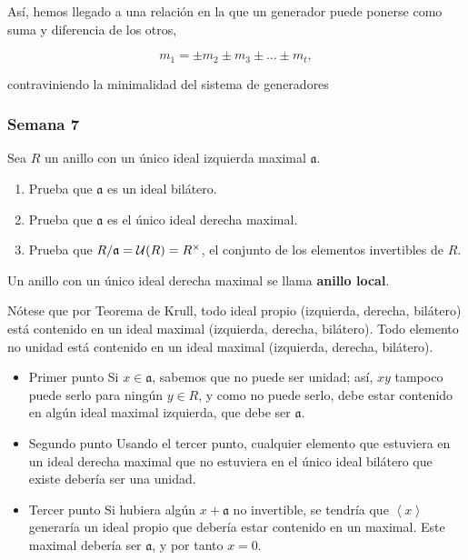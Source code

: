 \documentclass[11pt]{article}
\begin{document}
Así, hemos llegado a una relación en la que un generador puede ponerse
como suma y diferencia de los otros, 

\[
m_1 = \pm m_2 \pm m_3 \pm \dots \pm m_{t},
\]

contraviniendo la minimalidad del
sistema de generadores

\subsubsection*{Semana 7}
\label{sec-7-4-6}
\begin{statement}
Sea $R$ un anillo con un único ideal izquierda maximal $\mathfrak{a}$.

\begin{enumerate}
\item Prueba que $\mathfrak{a}$ es un ideal bilátero.
\item Prueba que $\mathfrak{a}$ es el único ideal derecha maximal.
\item Prueba que $R/\mathfrak{a} = {\cal U}(R) = R^{\times}$, el conjunto de los elementos 
invertibles de $R$.
\end{enumerate}

Un anillo con un único ideal derecha maximal se llama \textbf{anillo local}.
\end{statement}

Nótese que por Teorema de Krull, todo ideal propio (izquierda,
derecha, bilátero) está contenido en un ideal maximal (izquierda,
derecha, bilátero). Todo elemento no unidad está contenido en un
ideal maximal (izquierda, derecha, bilátero).

\begin{itemize}
\item Primer punto
\label{sec-7-4-6-1}
Si $x \in \mathfrak{a}$, sabemos que no puede ser unidad; así, $xy$ tampoco puede serlo 
para ningún $y \in R$, y como no puede serlo, debe estar contenido en algún
ideal maximal izquierda, que debe ser $\mathfrak{a}$.

\item Segundo punto
\label{sec-7-4-6-2}
Usando el tercer punto, cualquier elemento que estuviera en un ideal
derecha maximal que no estuviera en el único ideal bilátero que existe
debería ser una unidad.

\item Tercer punto
\label{sec-7-4-6-3}
Si hubiera algún $x + \mathfrak{a}$ no invertible, se tendría que $\left\langle x \right\rangle$ generaría un
ideal propio que debería estar contenido en un maximal. Este maximal
debería ser $\mathfrak{a}$, y por tanto $x = 0$.
\end{itemize}
\end{document}

